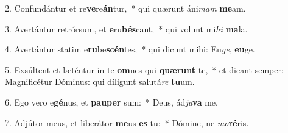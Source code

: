 2. Confundántur et re\textbf{ve}re\textbf{án}tur,~*  qui quærunt áni\textit{mam} \textbf{me}am.\

3. Avertántur retrórsum, et \textbf{e}ru\textbf{bés}cant,~*  qui volunt mi\textit{hi} \textbf{ma}la.\

4. Avertántur statim e\textbf{ru}be\textbf{scén}tes,~*  qui dicunt mihi: Eu\textit{ge}, \textbf{eu}ge.\

5. Exsúltent et læténtur in te \textbf{om}nes qui \textbf{quæ}\textbf{runt} te,~*  et dicant semper: Magnificétur Dóminus: qui díligunt salutá\textit{re} \textbf{tu}um.\

6. Ego vero e\textbf{gé}nus, et \textbf{pau}\textbf{per} sum:~*  Deus, ád\textit{ju}\textbf{va} me.\

7. Adjútor meus, et liberátor \textbf{me}us \textbf{es} tu:~*  Dómine, ne \textit{mo}\textbf{ré}ris.\

